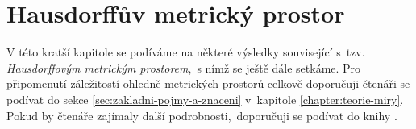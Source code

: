 \chapter{Hausdorffův metrický prostor}\label{chapter:hausdorffuv-mp}

V této kratší kapitole se podíváme na některé výsledky související s~tzv. \emph{Hausdorffovým metrickým prostorem},~s nímž se ještě dále setkáme. Pro připomenutí záležitostí ohledně metrických prostorů celkově doporučuji čtenáři se podívat do sekce \ref{sec:zakladni-pojmy-a-znaceni} v~kapitole \ref{chapter:teorie-miry}. Pokud by čtenáře zajímaly další podrobnosti,~doporučuji se podívat do knihy \citep[str. 71]{Edgar2008}.

